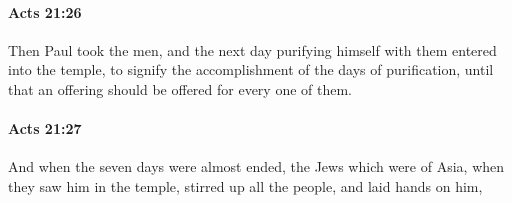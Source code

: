 		\paragraph{Acts 21:26} %
			\label{ACTS-21-26}

			Then Paul took the men, and the next day purifying himself with them entered into the temple, to signify the accomplishment of the days of purification, until that an offering should be offered for every one of them.

			\begin{framed}
			\scriptsize
				\begin{compactdesc}
					\item[SBLG] 
				\end{compactdesc}
			\end{framed}

		\paragraph{Acts 21:27} %
			\label{ACTS-21-27}

			And when the seven days were almost ended, the Jews which were of Asia, when they saw him in the temple, stirred up all the people, and laid hands on him,

